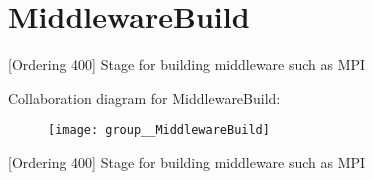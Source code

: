 \hypertarget{group__MiddlewareBuild}{\section{Middleware\-Build}
\label{group__MiddlewareBuild}
}


\mbox{[}Ordering 400\mbox{]} Stage for building middleware such as M\-P\-I  


Collaboration diagram for Middleware\-Build\-:\nopagebreak
\begin{figure}[H]
\begin{center}
\leavevmode
\texttt{[image: group\_\_MiddlewareBuild]}
\end{center}
\end{figure}
\mbox{[}Ordering 400\mbox{]} Stage for building middleware such as M\-P\-I 